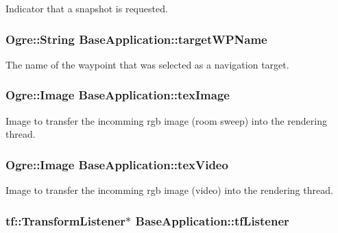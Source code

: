 \-Indicator that a snapshot is requested. \hypertarget{classBaseApplication_a3aff6a781058410dc648c0d07fd7afb8}{
\subsubsection[{target\-W\-P\-Name}]{\setlength{\rightskip}{0pt plus 5cm}\-Ogre\-::\-String {\bf \-Base\-Application\-::target\-W\-P\-Name}}}\label{classBaseApplication_a3aff6a781058410dc648c0d07fd7afb8}
\-The name of the waypoint that was selected as a navigation target. \hypertarget{classBaseApplication_a91123c8ea1b0c3e1562e64b7879de5e4}{
\subsubsection[{tex\-Image}]{\setlength{\rightskip}{0pt plus 5cm}\-Ogre\-::\-Image {\bf \-Base\-Application\-::tex\-Image}}}\label{classBaseApplication_a91123c8ea1b0c3e1562e64b7879de5e4}
\-Image to transfer the incomming rgb image (room sweep) into the rendering thread. \hypertarget{classBaseApplication_ab70dda7e59099d2309d9fdd4bf11c53a}{
\subsubsection[{tex\-Video}]{\setlength{\rightskip}{0pt plus 5cm}\-Ogre\-::\-Image {\bf \-Base\-Application\-::tex\-Video}}}\label{classBaseApplication_ab70dda7e59099d2309d9fdd4bf11c53a}
\-Image to transfer the incomming rgb image (video) into the rendering thread. \hypertarget{classBaseApplication_afed20466bdf46149a1bcad505a3e8022}{
\subsubsection[{tf\-Listener}]{\setlength{\rightskip}{0pt plus 5cm}tf\-::\-Transform\-Listener$\ast$ {\bf \-Base\-Application\-::tf\-Listener}}}\label{classBaseApplication_afed20466bdf46149a1bcad505a3e8022}
